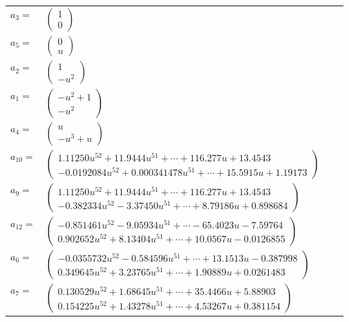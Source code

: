 \documentclass[1p]{elsarticle_modified}
\theoremstyle{definition}
\begin{document}
\begin{tabular}{m{7pt} m{180pt} m{7pt} m{180pt} }
\flushright $a_{3}=$&$\begin{pmatrix}1\\0\end{pmatrix}$ \\
\flushright $a_{5}=$&$\begin{pmatrix}0\\u\end{pmatrix}$ \\
\flushright $a_{2}=$&$\begin{pmatrix}1\\- u^2\end{pmatrix}$ \\
\flushright $a_{1}=$&$\begin{pmatrix}- u^2+1\\- u^2\end{pmatrix}$ \\
\flushright $a_{4}=$&$\begin{pmatrix}u\\- u^3+u\end{pmatrix}$ \\
\flushright $a_{10}=$&$\begin{pmatrix}1.11250 u^{52}+11.9444 u^{51}+\cdots+116.277 u+13.4543\\-0.0192084 u^{52}+0.000341478 u^{51}+\cdots+15.5915 u+1.19173\end{pmatrix}$ \\
\flushright $a_{9}=$&$\begin{pmatrix}1.11250 u^{52}+11.9444 u^{51}+\cdots+116.277 u+13.4543\\-0.382334 u^{52}-3.37450 u^{51}+\cdots+8.79186 u+0.898684\end{pmatrix}$ \\
\flushright $a_{12}=$&$\begin{pmatrix}-0.851461 u^{52}-9.05934 u^{51}+\cdots-65.4023 u-7.59764\\0.902652 u^{52}+8.13404 u^{51}+\cdots+10.0567 u-0.0126855\end{pmatrix}$ \\
\flushright $a_{6}=$&$\begin{pmatrix}-0.0355732 u^{52}-0.584596 u^{51}+\cdots+13.1513 u-0.387998\\0.349645 u^{52}+3.23765 u^{51}+\cdots+1.90889 u+0.0261483\end{pmatrix}$ \\
\flushright $a_{7}=$&$\begin{pmatrix}0.130529 u^{52}+1.68645 u^{51}+\cdots+35.4466 u+5.88903\\0.154225 u^{52}+1.43278 u^{51}+\cdots+4.53267 u+0.381154\end{pmatrix}$ \\

\end{tabular}
\end{document}
